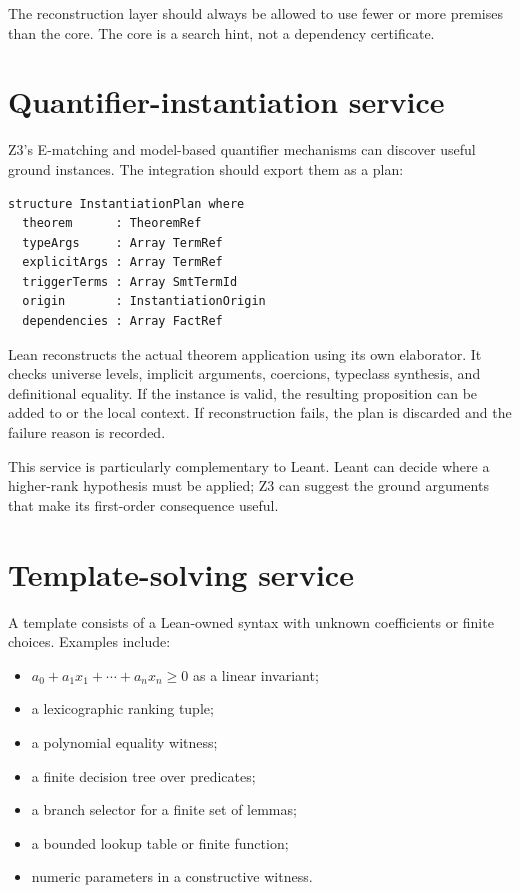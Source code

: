 \documentclass[11pt,letterpaper,openany]{report}
\newcommand{\code}[1]{\texttt{\detokenize{#1}}}
\begin{document}
The reconstruction layer should always be allowed to use fewer or more premises than
the core. The core is a search hint, not a dependency certificate.

\section{Quantifier-instantiation service}

Z3's E-matching and model-based quantifier mechanisms can discover useful ground
instances. The integration should export them as a plan:

\begin{lstlisting}[language=LeanFour,caption={Schematic theorem instantiation plan}]
structure InstantiationPlan where
  theorem      : TheoremRef
  typeArgs     : Array TermRef
  explicitArgs : Array TermRef
  triggerTerms : Array SmtTermId
  origin       : InstantiationOrigin
  dependencies : Array FactRef
\end{lstlisting}

Lean reconstructs the actual theorem application using its own elaborator. It checks
universe levels, implicit arguments, coercions, typeclass synthesis, and definitional
equality. If the instance is valid, the resulting proposition can be added to
\code{grind} or the local context. If reconstruction fails, the plan is discarded and
the failure reason is recorded.

This service is particularly complementary to Leant. Leant can decide where a
higher-rank hypothesis must be applied; Z3 can suggest the ground arguments that make
its first-order consequence useful.

\section{Template-solving service}

A template consists of a Lean-owned syntax with unknown coefficients or finite
choices. Examples include:

\begin{itemize}
  \item \(a_0 + a_1 x_1 + \cdots + a_n x_n \ge 0\) as a linear invariant;
  \item a lexicographic ranking tuple;
  \item a polynomial equality witness;
  \item a finite decision tree over predicates;
  \item a branch selector for a finite set of lemmas;
  \item a bounded lookup table or finite function;
  \item numeric parameters in a constructive witness.
\end{itemize}
\end{document}
